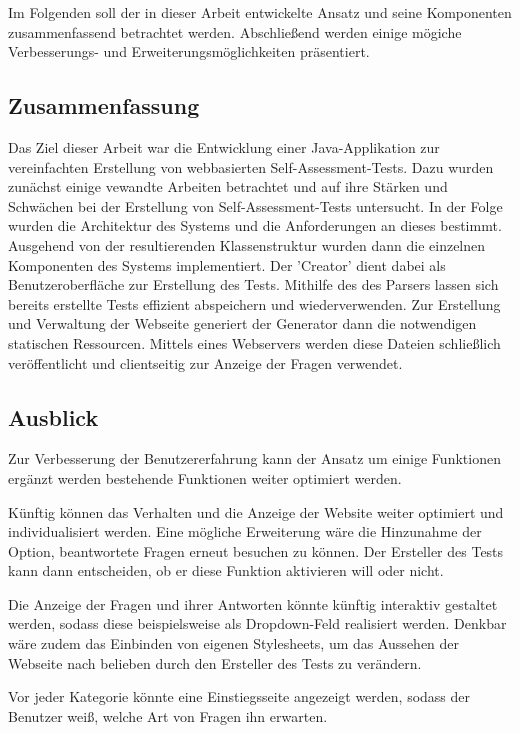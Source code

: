 \label{Zusammenfassung_Ausblick} 

Im Folgenden soll der in dieser Arbeit entwickelte Ansatz und seine Komponenten zusammenfassend betrachtet werden. Abschließend werden einige mögiche Verbesserungs- und Erweiterungsmöglichkeiten präsentiert.

\subsection{Zusammenfassung}

Das Ziel dieser Arbeit war die Entwicklung einer Java-Applikation zur vereinfachten Erstellung von webbasierten Self-Assessment-Tests. Dazu wurden zunächst einige vewandte Arbeiten betrachtet und auf ihre Stärken und Schwächen bei der Erstellung von Self-Assessment-Tests untersucht. In der Folge wurden die Architektur des Systems und die Anforderungen an dieses bestimmt. Ausgehend von der resultierenden Klassenstruktur wurden dann die einzelnen Komponenten des Systems implementiert. Der 'Creator' dient dabei als Benutzeroberfläche zur Erstellung des Tests. Mithilfe des des Parsers lassen sich bereits erstellte Tests effizient abspeichern und wiederverwenden. Zur Erstellung und Verwaltung der Webseite generiert der Generator dann die notwendigen statischen Ressourcen. Mittels eines Webservers werden diese Dateien schließlich veröffentlicht und clientseitig zur Anzeige der Fragen verwendet.

\subsection{Ausblick}

Zur Verbesserung der Benutzererfahrung kann der Ansatz um einige Funktionen ergänzt werden bestehende Funktionen weiter optimiert werden. 

Künftig können das Verhalten und die Anzeige der Website weiter optimiert und individualisiert werden.  
Eine mögliche Erweiterung wäre die Hinzunahme der Option, beantwortete Fragen erneut besuchen zu können. Der Ersteller des Tests kann dann entscheiden, ob er diese Funktion aktivieren will oder nicht.

Die Anzeige der Fragen und ihrer Antworten könnte künftig interaktiv gestaltet werden, sodass diese beispielsweise als Dropdown-Feld realisiert werden. Denkbar wäre zudem das Einbinden von eigenen Stylesheets, um das Aussehen der Webseite nach belieben durch den Ersteller des Tests zu verändern.

Vor jeder Kategorie könnte eine Einstiegsseite angezeigt werden, sodass der Benutzer weiß, welche Art von Fragen ihn erwarten.

